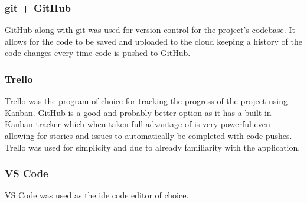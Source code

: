 \subsubsection{git + GitHub}

GitHub along with git was used for version control for the project's codebase. It allows for the code to be saved and uploaded to the cloud keeping a history of the code changes every time code is pushed to GitHub.

\subsubsection{Trello}

Trello was the program of choice for tracking the progress of the project using Kanban. GitHub is a good and probably better option as it has a built-in Kanban tracker which when taken full advantage of is very powerful even allowing for stories and issues to automatically be completed with code pushes. Trello was used for simplicity and due to already familiarity with the application.

\subsubsection{VS Code}
VS Code was used as the ide code editor of choice.